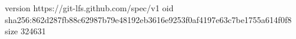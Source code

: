 version https://git-lfs.github.com/spec/v1
oid sha256:862d287fb88c62987b79e48192eb3616e9253f0af4197e63c7be1755a614f0f8
size 324631
